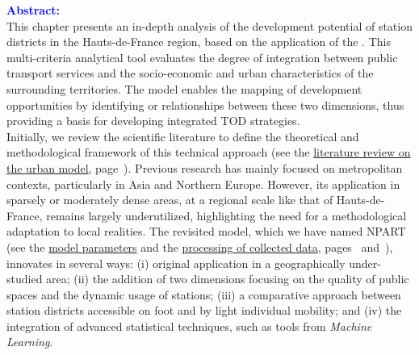 \begin{refsegment}
\newpage
\begin{tcolorbox}[colback=white!5!white,
                      colframe=blue!75!blue,
                      title=
                      \bigskip
                      \center{\textbf{Preambule of Chapter~6}}
                      \\
                      \raggedright{\small{Chapter composed of \pagedifference{chap6:titre}{part3:conclusion} pages, including \pagedifference{chap6:bibliographie}{part3:conclusion} pages of bibliography}}
                      \bigskip]
\Large{\textcolor{blue}{\textbf{Abstract:}}}
    \\
    \small{
This chapter presents an in-depth analysis of the development potential of station districts in the Hauts-de-France region, based on the application of the . This multi-criteria analytical tool evaluates the degree of integration between public transport services and the socio-economic and urban characteristics of the surrounding territories. The model enables the mapping of development opportunities by identifying  or  relationships between these two dimensions, thus providing a basis for developing integrated \acrfull{TOD} strategies.%
    \\
Initially, we review the scientific literature to define the theoretical and methodological framework of this technical approach (see the \hyperref[chap6:revue-litterature-m-tod-index]{literature review on the urban model}, page~\pageref{chap6:revue-litterature-m-tod-index}). Previous research has mainly focused on metropolitan contexts, particularly in Asia and Northern Europe. However, its application in sparsely or moderately dense areas, at a regional scale like that of Hauts-de-France, remains largely underutilized, highlighting the need for a methodological adaptation to local realities. The revisited model, which we have named \acrfull{NPART} (see the \hyperref[chap6:selection-indicateurs]{model parameters} and the \hyperref[chap6:methodologie-m-tod-index]{processing of collected data}, pages~\pageref{chap6:selection-indicateurs} and~\pageref{chap6:methodologie-m-tod-index}), innovates in several ways: (i) original application in a geographically under-studied area; (ii) the addition of two dimensions focusing on the quality of public spaces and the dynamic usage of stations; (iii) a comparative approach between station districts accessible on foot and by light individual mobility; and (iv) the integration of advanced statistical techniques, such as tools from \textsl{Machine Learning}.%
}
\end{tcolorbox}
\end{refsegment}
